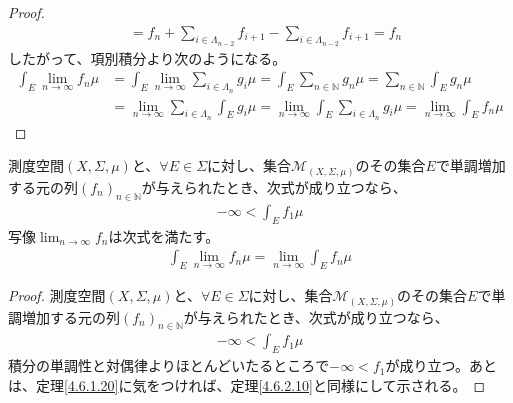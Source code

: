 \documentclass[dvipdfmx]{jsarticle}
\begin{document}
\begin{proof}
\begin{align*}
&= f_{n} + \sum_{i \in \varLambda_{n - 2}} f_{i + 1} - \sum_{i \in \varLambda_{n - 2}} f_{i + 1} = f_{n}
\end{align*}
したがって、項別積分より次のようになる。
\begin{align*}
\int_{E} {\lim_{n \rightarrow \infty}f_{n}\mu} &= \int_{E} {\lim_{n \rightarrow \infty}{\sum_{i \in \varLambda_{n}} g_{i}}\mu} = \int_{E} {\sum_{n \in \mathbb{N}} g_{n}\mu} = \sum_{n \in \mathbb{N}} {\int_{E} {g_{n}\mu}}\\
&= \lim_{n \rightarrow \infty}{\sum_{i \in \varLambda_{n}} {\int_{E} {g_{i}\mu}}} = \lim_{n \rightarrow \infty}{\int_{E} {\sum_{i \in \varLambda_{n}} g_{i}\mu}} = \lim_{n \rightarrow \infty}{\int_{E} {f_{n}\mu}}
\end{align*}
\end{proof}
\begin{thm}\label{4.6.2.11}
測度空間$(X,\varSigma,\mu)$と、$\forall E \in \varSigma$に対し、集合$\mathcal{M}_{(X,\varSigma,\mu)}$のその集合$E$で単調増加する元の列$\left( f_{n} \right)_{n \in \mathbb{N}}$が与えられたとき、次式が成り立つなら、
\begin{align*}
- \infty < \int_{E} {f_{1}\mu}
\end{align*}
写像$\lim_{n \rightarrow \infty}f_{n}$は次式を満たす。
\begin{align*}
\int_{E} {\lim_{n \rightarrow \infty}f_{n}\mu} = \lim_{n \rightarrow \infty}{\int_{E} {f_{n}\mu}}
\end{align*}
\end{thm}
\begin{proof}
測度空間$(X,\varSigma,\mu)$と、$\forall E \in \varSigma$に対し、集合$\mathcal{M}_{(X,\varSigma,\mu)}$のその集合$E$で単調増加する元の列$\left( f_{n} \right)_{n \in \mathbb{N}}$が与えられたとき、次式が成り立つなら、
\begin{align*}
- \infty < \int_{E} {f_{1}\mu}
\end{align*}
積分の単調性と対偶律よりほとんどいたるところで$- \infty < f_{1}$が成り立つ。あとは、定理\ref{4.6.1.20}に気をつければ、定理\ref{4.6.2.10}と同様にして示される。
\end{proof}
\end{document}

